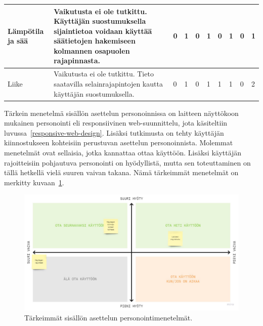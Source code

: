 \documentclass[finnish, 12pt, a4paper, elec, utf8, a-1b, online]{aaltothesis}
\begin{document}
{\begin{longtable}{p{2.5cm}|p{6cm}|p{0.5cm}p{0.5cm}p{0.5cm}|p{0.5cm}|p{0.5cm}p{0.5cm}p{0.5cm}|p{0.5cm}|}
    \midrule
    Lämpötila ja sää                        & Vaikutusta ei ole tutkittu. Käyttäjän suostumuksella sijaintietoa voidaan käyttää säätietojen hakemiseen kolmannen osapuolen rajapinnasta.                                                                                                                                                                                        & 0                                          & 1                                   & 0                                      & 1                            & 0                                               & 1                                         & 0                                         & 1                            \\
    \midrule
    Liike                                   & Vaikutusta ei ole tutkittu. Tieto saatavilla selainrajapintojen kautta käyttäjän suostumuksella.                                                                                                                                                                                                                                  & 0                                          & 1                                   & 0                                      & 1                            & 1                                               & 1                                         & 0                                         & 2                            \\
\end{longtable}
}

Tärkein menetelmä sisällön asettelun personoinnissa on laitteen näyttökoon
mukainen personointi eli responsiivinen web-suunnittelu, jota käsiteltiin
luvussa~\ref{responsive-web-design}. Lisäksi tutkimusta on tehty käyttäjän
kiinnostukseen kohteisiin perustuvan asettelun personoinnista. Molemmat
menetelmät ovat sellaisia, jotka kannattaa ottaa käyttöön. Lisäksi käyttäjän
rajoitteisiin pohjautuva personointi on hyödyllistä, mutta sen toteuttaminen on
tällä hetkellä vielä suuren vaivan takana. Nämä tärkeimmät menetelmät on
merkitty kuvaan~\ref{fig:layout-priorization}.

\begin{figure}[htb]
    \centering
    \includegraphics[width=\textwidth]{images/layout-priorization.pdf}
    \caption{Tärkeimmät sisällön asettelun personointimenetelmät.~\label{fig:layout-priorization}}
\end{figure}
\end{document}
